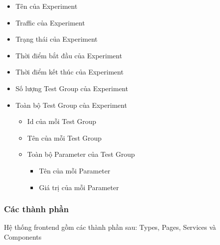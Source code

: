 \begin{itemize}
\begin{itemize}
	\end{itemize}
	\begin{itemize}
		\item Tên của Experiment
		\item Traffic của Experiment
		\item Trạng thái của Experiment
		\item Thời điểm bắt đầu của Experiment
		\item Thời điểm kết thúc của Experiment
		\item Số lượng Test Group của Experiment
		\item Toàn bộ Test Group của Experiment
		      \begin{itemize}
			      \item Id của mỗi Test Group
			      \item Tên của mỗi Test Group
			      \item Toàn bộ Parameter của Test Group
			            \begin{itemize}
				            \item Tên của mỗi Parameter
				            \item Giá trị của mỗi Parameter
			            \end{itemize}
		      \end{itemize}
	\end{itemize}
\end{itemize}

\subsubsection{Các thành phần}

Hệ thống frontend gồm các thành phần sau: Types, Pages, Services và Components

\begin{itemize}
\end{itemize}


